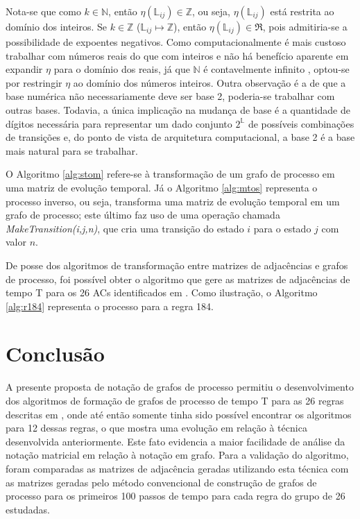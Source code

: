 \documentclass[a4,11pt]{article}
\begin{document}
Nota-se que como $k \in \mathbb{N}$, então $\eta(\mathbb{L}_{ij}) \in \mathbb{Z}$,
ou seja, $\eta(\mathbb{L}_{ij})$ está restrita ao domínio dos inteiros. Se
$k \in \mathbb{Z}$ ($\mathbb{L}_{ij} \mapsto \mathbb{Z}$), então
$\eta(\mathbb{L}_{ij}) \in \Re$, pois admitiria-se a possibilidade de expoentes negativos.
Como computacionalmente é mais custoso trabalhar com números reais do que com inteiros
e não há benefício aparente em expandir $\eta$ para o domínio dos reais,
já que $\mathbb{N}$ é contavelmente infinito \cite{lewis2008}, optou-se
por restringir $\eta$ ao domínio dos números inteiros. Outra observação
é a de que a base numérica não necessariamente deve ser base 2, poderia-se trabalhar com outras
bases. Todavia, a única implicação na mudança de base é a quantidade de dígitos
necessária para representar um dado conjunto $2^{\mathbb{L}}$ de possíveis combinações de
transições e, do ponto de vista de arquitetura computacional, a base 2 é a
base mais natural para se trabalhar.

O Algoritmo \ref{alg:stom} refere-se à transformação de um grafo
de processo em uma matriz de evolução temporal. Já o Algoritmo \ref{alg:mtos}
representa o processo inverso, ou seja, transforma uma
matriz de evolução temporal em um grafo de processo; este último
faz uso de uma operação chamada \emph{MakeTransition(i,j,n)}, que cria uma transição
do estado $i$ para o estado $j$ com valor $n$.

De posse dos algoritmos de transformação entre matrizes de adjacências e grafos
de processo, foi possível obter o algoritmo que gere as matrizes de adjacências de tempo
T para os 26 ACs identificados em \cite{trafaniuc2004}. Como
ilustração, o Algoritmo \ref{alg:r184} representa o processo para a regra 184.

\section{Conclusão}\label{sec:conclusion}

A presente proposta de notação de grafos de processo permitiu o
desenvolvimento dos algoritmos de formação de grafos de processo de tempo
T para as 26 regras descritas em \cite{trafaniuc2004}, onde até então
somente tinha sido possível encontrar os algoritmos para 12 dessas regras,
o que mostra uma evolução em relação à técnica desenvolvida anteriormente.
Este fato evidencia a maior facilidade de análise da notação matricial em
relação à notação em grafo. Para a validação do algoritmo, foram comparadas
as matrizes de adjacência geradas utilizando esta técnica com as matrizes
geradas pelo método convencional de construção de grafos de processo para
os primeiros 100 passos de tempo para cada regra do grupo de 26 estudadas.
\end{document}
